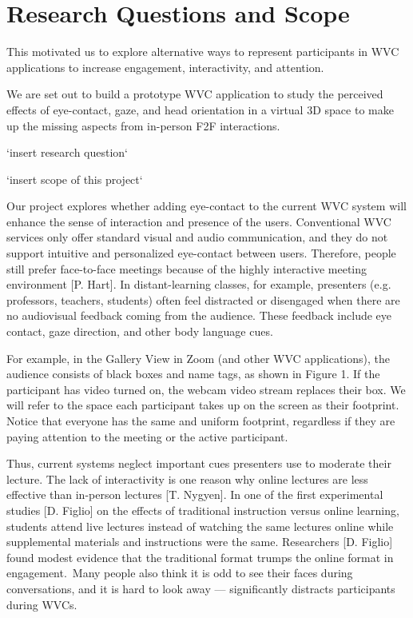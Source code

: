 \section{Research Questions and Scope}

This motivated us to explore alternative ways to represent participants in WVC applications to increase engagement, interactivity, and attention. 

We are set out to build a prototype WVC application to study the perceived effects of eye-contact, gaze, and head orientation in a virtual 3D space to make up the missing aspects from in-person F2F interactions.

`insert research question`

`insert scope of this project`

Our project explores whether adding eye-contact to the current WVC system will enhance the sense of interaction and presence of the users. Conventional WVC services only offer standard visual and audio communication, and they do not support intuitive and personalized eye-contact between users. Therefore, people still prefer face-to-face meetings because of the highly interactive meeting environment [P. Hart].
In distant-learning classes, for example, presenters (e.g. professors, teachers, students) often feel distracted or disengaged when there are no audiovisual feedback coming from the audience. These feedback include eye contact, gaze direction, and other body language cues.

For example, in the Gallery View in Zoom (and other WVC applications), the audience consists of black boxes and name tags, as shown in Figure 1. If the participant has video turned on, the webcam video stream replaces their box. We will refer to the space each participant takes up on the screen as their footprint. Notice that everyone has the same and uniform footprint, regardless if they are paying attention to the meeting or the active participant.

Thus, current systems neglect important cues presenters use to moderate their lecture. The lack of interactivity is one reason why online lectures are less effective than in-person lectures [T. Nygyen]. In one of the first experimental studies [D. Figlio] on the effects of traditional instruction versus online learning, students attend live lectures instead of watching the same lectures online while supplemental materials and instructions were the same. Researchers [D. Figlio] found modest evidence that the traditional format trumps the online format in engagement. Many people also think it is odd to see their faces during conversations, and it is hard to look away --- significantly distracts participants during WVCs.

